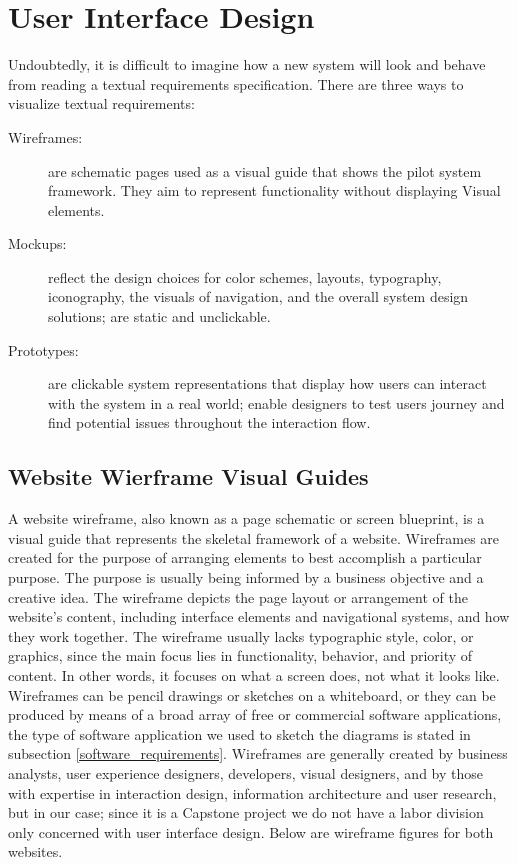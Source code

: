 \section{User Interface Design}
Undoubtedly, it is difficult to imagine how a new system will look and behave from reading a textual requirements specification. There are three ways to visualize textual requirements:
\begin{description}
	\item[Wireframes:] are schematic pages used as a visual guide that shows the pilot system framework. They aim to represent functionality without displaying Visual elements.
	\item[Mockups:] reflect the design choices for color schemes, layouts, typography, iconography, the visuals of navigation, and the overall system design solutions; are static and unclickable.
	\item[Prototypes:] are clickable system representations that display how users can interact with the system in a real world; enable designers to test users journey and find potential issues throughout the interaction flow.
\end{description}

\subsection{Website Wierframe Visual Guides}
A website wireframe, also known as a page schematic or screen blueprint, is a visual guide that represents the skeletal framework of a website. Wireframes are created for the purpose of arranging elements to best accomplish a particular purpose. The purpose is usually being informed by a business objective and a creative idea. The wireframe depicts the page layout or arrangement of the website's content, including interface elements and navigational systems, and how they work together. The wireframe usually lacks typographic style, color, or graphics, since the main focus lies in functionality, behavior, and priority of content. In other words, it focuses on what a screen does, not what it looks like. Wireframes can be pencil drawings or sketches on a whiteboard, or they can be produced by means of a broad array of free or commercial software applications, the type of software application we used to sketch the diagrams is stated in subsection \ref{software_requirements}. Wireframes are generally created by business analysts, user experience designers, developers, visual designers, and by those with expertise in interaction design, information architecture and user research, but in our case; since it is a Capstone project we do not have a labor division only concerned with user interface design. Below are wireframe figures for both websites.

